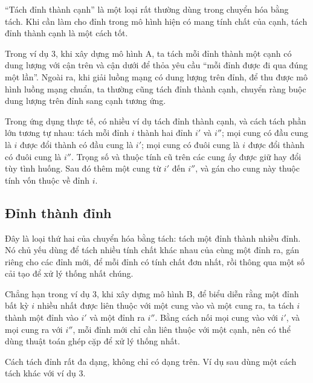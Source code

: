 \documentclass[11pt]{article}
\begin{document}
``Tách đỉnh thành cạnh'' là một loại rất thường dùng trong chuyển hóa bằng
tách. Khi cần làm cho đỉnh trong mô hình hiện có mang tính chất của cạnh,
tách đỉnh thành cạnh là một cách tốt.

Trong ví dụ 3, khi xây dựng mô hình A, ta tách mỗi đỉnh thành một cạnh có
dung lượng với cận trên và cận dưới để thỏa yêu cầu ``mỗi đỉnh được đi qua
đúng một lần''. Ngoài ra, khi giải luồng mạng có dung lượng trên đỉnh, để thu
được mô hình luồng mạng chuẩn, ta thường cũng tách đỉnh thành cạnh, chuyển
ràng buộc dung lượng trên đỉnh sang cạnh tương ứng.

Trong ứng dụng thực tế, có nhiều ví dụ tách đỉnh thành cạnh, và cách tách
phần lớn tương tự nhau: tách mỗi đỉnh \(i\) thành hai đỉnh \(i'\) và \(i''\);
mọi cung có đầu cung là \(i\) được đổi thành có đầu cung là \(i'\); mọi cung
có đuôi cung là \(i\) được đổi thành có đuôi cung là \(i''\). Trọng số và
thuộc tính cũ trên các cung ấy được giữ hay đổi tùy tình huống. Sau đó thêm
một cung từ \(i'\) đến \(i''\), và gán cho cung này thuộc tính vốn thuộc về
đỉnh \(i\).

\subsection{Đỉnh thành đỉnh}

Đây là loại thứ hai của chuyển hóa bằng tách: tách một đỉnh thành nhiều đỉnh.
Nó chủ yếu dùng để tách nhiều tính chất khác nhau của cùng một đỉnh ra, gán
riêng cho các đỉnh mới, để mỗi đỉnh có tính chất đơn nhất, rồi thông qua một
số cải tạo để xử lý thống nhất chúng.

Chẳng hạn trong ví dụ 3, khi xây dựng mô hình B, để biểu diễn rằng một đỉnh
bất kỳ \(i\) nhiều nhất được liên thuộc với một cung vào và một cung ra, ta
tách \(i\) thành một đỉnh vào \(i'\) và một đỉnh ra \(i''\). Bằng cách nối
mọi cung vào với \(i'\), và mọi cung ra với \(i''\), mỗi đỉnh mới chỉ cần
liên thuộc với một cạnh, nên có thể dùng thuật toán ghép cặp để xử lý thống
nhất.

Cách tách đỉnh rất đa dạng, không chỉ có dạng trên. Ví dụ sau dùng một cách
tách khác với ví dụ 3.
\end{document}
